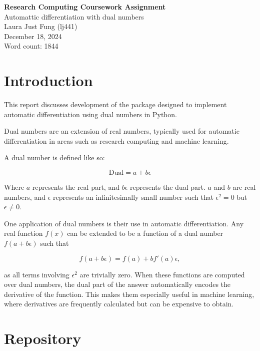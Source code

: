 \documentclass[11pt,a4paper]{article}
\begin{document}
 

\begin{center}
    \LARGE{\textbf{Research Computing Coursework Assignment}}
    \\
    \Large{{Automattic differentiation with dual numbers}}
    \\
    \large{Laura Just Fung (lj441)}
    \\
    December 18, 2024
    \\
    Word count: 1844
\end{center}


\section{Introduction}
This report discusses development of the package designed to implement automatic differentiation using dual numbers in Python. 

Dual numbers are an extension of real numbers, typically used for automatic differentiation in areas such as research computing and machine learning.

A dual number is defined like so:

\begin{equation}
    \mathrm{Dual} = a + b \epsilon
\end{equation}

Where $a$ represents the real part, and $b\epsilon$ represents the dual part. $a$ and $b$ are real numbers, and $\epsilon$ represents an infinitesimally small number such that $\epsilon^2 = 0$ but $\epsilon \neq 0$.

One application of dual numbers is their use in automatic differentiation. Any real function $f(x)$ can be extended to be a function of a dual number $f(a+b \epsilon)$ such that

\begin{equation}
    f(a + b \epsilon) = f(a) + b f'(a)\epsilon,
\end{equation}

as all terms involving $\epsilon^2$ are trivially zero. When these functions are computed over dual numbers, the dual part of the answer automatically encodes the derivative of the function. This makes them especially useful in machine learning, where derivatives are frequently calculated but can be expensive to obtain.

\section{Repository}
\end{document}
